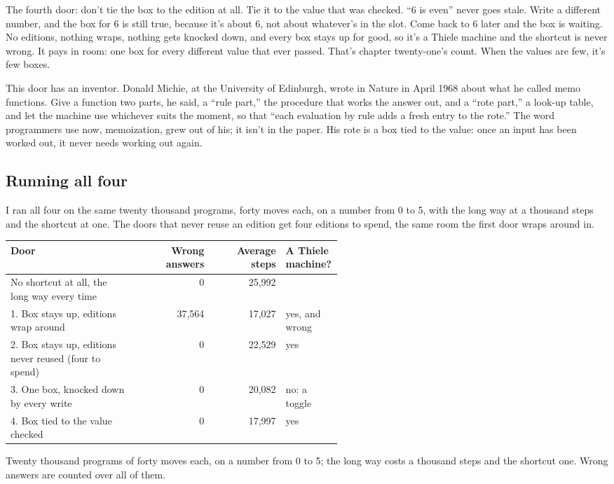 \documentclass[11pt,twoside]{article}
\theoremstyle{thielethm}
\theoremstyle{thieledef}
\theoremstyle{thieledef}
\theoremstyle{thieledef}
\theoremstyle{thielethm}
\theoremstyle{thieleobs}
\theoremstyle{thielethm}
\begin{document}
The fourth door: don't tie the box to the edition at all. Tie it to the value that was checked. ``6 is even'' never goes stale. Write a different number, and the box for 6 is still true, because it's about 6, not about whatever's in the slot. Come back to 6 later and the box is waiting. No editions, nothing wraps, nothing gets knocked down, and every box stays up for good, so it's a Thiele machine and the shortcut is never wrong. It pays in room: one box for every different value that ever passed. That's chapter twenty-one's count. When the values are few, it's few boxes.

This door has an inventor. Donald Michie, at the University of Edinburgh, wrote in Nature in April 1968 about what he called memo functions. Give a function two parts, he said, a ``rule part,'' the procedure that works the answer out, and a ``rote part,'' a look-up table, and let the machine use whichever suits the moment, so that ``each evaluation by rule adds a fresh entry to the rote.'' The word programmers use now, memoization, grew out of his; it isn't in the paper. His rote is a box tied to the value: once an input has been worked out, it never needs working out again.

\subsection{Running all four}

I ran all four on the same twenty thousand programs, forty moves each, on a number from 0 to 5, with the long way at a thousand steps and the shortcut at one. The doors that never reuse an edition get four editions to spend, the same room the first door wraps around in.

\begin{center}\small
\begin{tabular}{@{}p{0.38\linewidth}rr>{\raggedright\arraybackslash}p{0.17\linewidth}@{}}
\toprule
Door & Wrong answers & Average steps & A Thiele machine? \\
\midrule
No shortcut at all, the long way every time & 0 & 25{,}992 & \\
1. Box stays up, editions wrap around & 37{,}564 & 17{,}027 & yes, and wrong \\
2. Box stays up, editions never reused (four to spend) & 0 & 22{,}529 & yes \\
3. One box, knocked down by every write & 0 & 20{,}082 & no: a toggle \\
4. Box tied to the value checked & 0 & 17{,}997 & yes \\
\bottomrule
\end{tabular}

\footnotesize Twenty thousand programs of forty moves each, on a number from 0 to 5; the long
way costs a thousand steps and the shortcut one. Wrong answers are counted over all of them.
\end{center}
\end{document}
